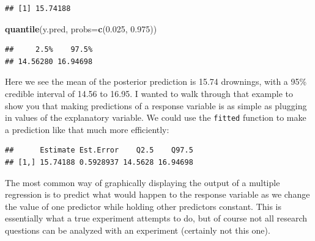 \documentclass[
]{book}
\newenvironment{Shaded}{\begin{snugshade}}{\end{snugshade}}
\newcommand{\AttributeTok}[1]{\textcolor[rgb]{0.13,0.29,0.53}{#1}}
\newcommand{\DecValTok}[1]{\textcolor[rgb]{0.00,0.00,0.81}{#1}}
\newcommand{\FloatTok}[1]{\textcolor[rgb]{0.00,0.00,0.81}{#1}}
\newcommand{\FunctionTok}[1]{\textcolor[rgb]{0.13,0.29,0.53}{\textbf{#1}}}
\newcommand{\NormalTok}[1]{#1}
\newcommand{\OtherTok}[1]{\textcolor[rgb]{0.56,0.35,0.01}{#1}}
\newcommand{\SpecialCharTok}[1]{\textcolor[rgb]{0.81,0.36,0.00}{\textbf{#1}}}
\begin{document}
\begin{verbatim}
## [1] 15.74188
\end{verbatim}

\begin{Shaded}
\begin{Highlighting}[]
\FunctionTok{quantile}\NormalTok{(y.pred, }\AttributeTok{probs=}\FunctionTok{c}\NormalTok{(}\FloatTok{0.025}\NormalTok{, }\FloatTok{0.975}\NormalTok{))}
\end{Highlighting}
\end{Shaded}

\begin{verbatim}
##     2.5%    97.5% 
## 14.56280 16.94698
\end{verbatim}

Here we see the mean of the posterior prediction is 15.74 drownings, with a 95\% credible interval of 14.56 to 16.95. I wanted to walk through that example to show you that making predictions of a response variable is as simple as plugging in values of the explanatory variable. We could use the \texttt{fitted} function to make a prediction like that much more efficiently:

\begin{Shaded}
\end{Shaded}

\begin{verbatim}
##      Estimate Est.Error    Q2.5    Q97.5
## [1,] 15.74188 0.5928937 14.5628 16.94698
\end{verbatim}

The most common way of graphically displaying the output of a multiple regression is to predict what would happen to the response variable as we change the value of one predictor while holding other predictors constant. This is essentially what a true experiment attempts to do, but of course not all research questions can be analyzed with an experiment (certainly not this one).
\end{document}
